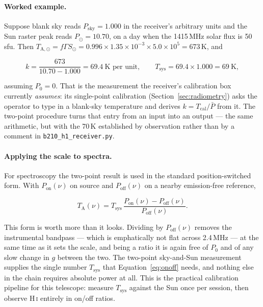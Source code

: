 \documentclass[11pt,a4paper]{article}
\begin{document}
\paragraph{Worked example.} Suppose blank sky reads $P_\text{sky} = 1.000$ in the receiver's arbitrary units and the Sun raster peak reads $P_\odot = 10.70$, on a day when the 1415\,MHz solar flux is 50\,sfu. Then $T_{\text{A},\odot} = f\Gamma S_\odot = 0.996 \times 1.35\times10^{-3} \times 5.0\times10^5 = 673$\,K, and

\begin{equation}
k = \frac{673}{10.70 - 1.000} = 69.4\ \text{K per unit},
\qquad
T_\text{sys} = 69.4 \times 1.000 = 69\ \text{K},
\end{equation}

assuming $P_0 = 0$. That is the measurement the receiver's calibration box currently \emph{assumes}: its single-point calibration (Section~\ref{sec:radiometry}) asks the operator to type in a blank-sky temperature and derives $k = T_\text{cal}/\bar{P}$ from it. The two-point procedure turns that entry from an input into an output --- the same arithmetic, but with the 70\,K established by observation rather than by a comment in \texttt{b210\_h1\_receiver.py}.

\paragraph{Applying the scale to spectra.} For spectroscopy the two-point result is used in the standard position-switched form. With $P_\text{on}(\nu)$ on source and $P_\text{off}(\nu)$ on a nearby emission-free reference,

\begin{equation}
T_\text{A}(\nu) = T_\text{sys}\,\frac{P_\text{on}(\nu) - P_\text{off}(\nu)}{P_\text{off}(\nu)}.
\label{eq:onoff}
\end{equation}

This form is worth more than it looks. Dividing by $P_\text{off}(\nu)$ removes the instrumental bandpass --- which is emphatically not flat across 2.4\,MHz --- at the same time as it sets the scale, and being a ratio it is again free of $P_0$ and of any slow change in $g$ between the two. The two-point sky-and-Sun measurement supplies the single number $T_\text{sys}$ that Equation~\eqref{eq:onoff} needs, and nothing else in the chain requires absolute power at all. This is the practical calibration pipeline for this telescope: measure $T_\text{sys}$ against the Sun once per session, then observe H\,\textsc{i} entirely in on/off ratios.
\end{document}

